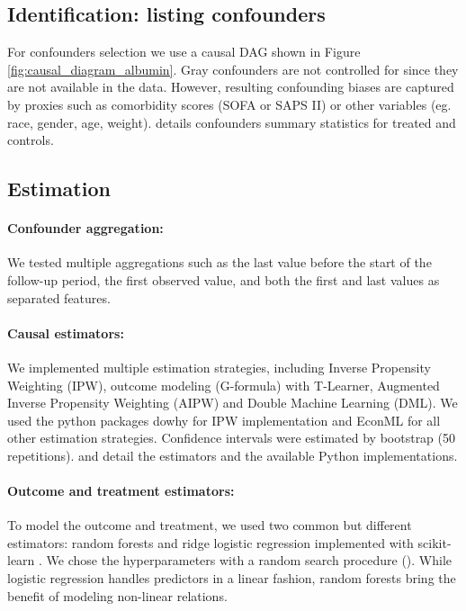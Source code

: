 \documentclass[10pt,letterpaper]{article}
\begin{document}
\subsection*{Identification: listing confounders}\label{sec:identification_mimic_iv}

For confounders selection we use a causal DAG shown in Figure
\ref{fig:causal_diagram_albumin}. Gray confounders are not controlled for since
they are not available in the data. However, resulting confounding biases are
captured by proxies such as comorbidity scores (SOFA or SAPS II) or other
variables (eg. race, gender, age, weight).
%
 details confounders
summary statistics for treated and controls.

\subsection*{Estimation}\label{sec:estimation_mimic_iv}


\paragraph{Confounder aggregation:}

We tested multiple aggregations such as the last value before the start of the
follow-up period, the first observed value, and both the first and last values as
separated features.

\paragraph{Causal estimators:}

We implemented multiple estimation strategies, including Inverse Propensity
Weighting (IPW), outcome modeling (G-formula) with T-Learner, Augmented Inverse
Propensity Weighting (AIPW) and Double Machine Learning (DML). We used the
python packages dowhy \cite{sharma2018tutorial} for IPW implementation and
EconML \cite{battocchi2019econml} for all other estimation strategies.
Confidence intervals were estimated by bootstrap (50 repetitions).
 and
 detail the estimators and the available Python
implementations.

\paragraph{Outcome and treatment estimators:}

To model the outcome and treatment, we used two common but different
estimators: random forests and ridge logistic regression implemented with scikit-learn
\cite{pedregosa2011scikit}. We chose the
hyperparameters with a random search procedure (). While logistic regression handles
predictors in a linear fashion, random forests bring the benefit of modeling
non-linear relations.
\end{document}
